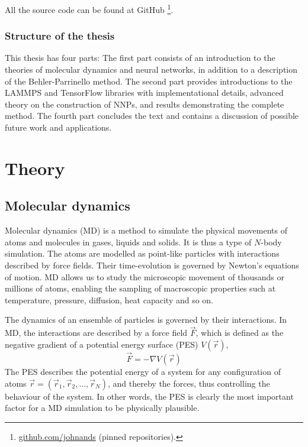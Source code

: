 \documentclass[twoside,english]{uiofysmaster}
\begin{document}
\noindent All the source code can be found at GitHub%
\footnote{\href{https://github.com/johnands}{github.com/johnands} (pinned repositories).}.




\section{Structure of the thesis}
This thesis has four parts: The first part consists of an introduction to the theories of 
molecular dynamics and neural networks, in addition to a description of the Behler-Parrinello method.  
The second part provides introductions to the LAMMPS and TensorFlow libraries with implementational details, 
advanced theory on the construction of NNPs, and results demonstrating the complete method. 
The fourth part concludes the text and contains a discussion of possible future work and applications. 




\part{Theory}

\chapter{Molecular dynamics} \label{sec:MD}
Molecular dynamics (MD) is a method to simulate the physical movements of atoms and molecules in gases, liquids and solids. 
It is thus a type of $N$-body simulation. The atoms are modelled as point-like particles with interactions described
by force fields. Their time-evolution is governed by Newton's equations of motion. MD allows us to study the microscopic
movement of thousands or millions of atoms, enabling the sampling of macroscopic properties such at temperature, pressure, 
diffusion, heat capacity and so on. 

The dynamics of an ensemble of particles is governed by their interactions. 
In MD, the interactions are described
by a force field $\vec{F}$, which is defined as the negative gradient of a 
potential energy surface (PES) $V(\vec{r})$,
\begin{equation}
 \vec{F} = -\nabla V(\vec{r})
 \label{forcePES}
\end{equation}
The PES describes the potential energy of a system for any configuration of atoms 
$\vec{r} = (\vec{r}_1, \vec{r}_2, \dots, \vec{r}_N)$, and thereby the forces, thus
controlling the behaviour of the system. In other words, the PES is clearly the most important
factor for a MD simulation to be physically plausible. 
\end{document}
